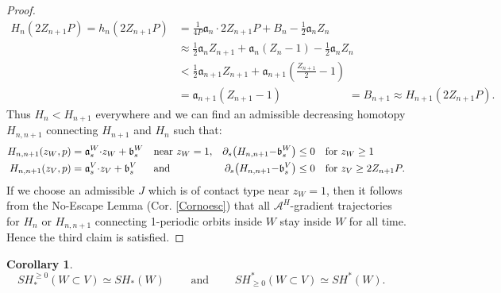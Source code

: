 \documentclass[a4paper,12pt,bibliography=totocnumbered,titlepage=false,abstracton,bookmarksnumbered=true]{scrartcl}
\newtheorem{cor}[defn]{Corollary}
\theoremstyle{definition}
\begin{document}
\begin{proof}
\begin{align*}
 H_n(2Z_{n+1}P)=h_n(2Z_{n+1}P)&=\textstyle\frac{1}{4P}\mathfrak{a}_n{\cdot} 2Z_{n+1}P+B_n-\frac{1}{2}\mathfrak{a}_nZ_n\\
 &\approx \textstyle\frac{1}{2}\mathfrak{a}_nZ_{n+1}+\mathfrak{a}_n(Z_n{-}1)-\frac{1}{2}\mathfrak{a}_nZ_n\\
 &<\textstyle\frac{1}{2}\mathfrak{a}_{n+1}Z_{n+1}+\mathfrak{a}_{n+1}(\frac{Z_{n+1}}{2}-1)\\
 &=\mathfrak{a}_{n+1}(Z_{n+1}{-}1)\qquad\qquad\qquad=B_{n+1}\approx H_{n+1}(2Z_{n+1}P).
\end{align*}
Thus $H_n<H_{n+1}$ everywhere and we can find an admissible decreasing homotopy $H_{n,n+1}$ connecting $H_{n+1}$ and $H_n$ such that:
\begin{align*}
 H_{n,n+1}(z_W,p)&=\mathfrak{a}_s^W{\cdot} z_W + \mathfrak{b}^W_s & &\text{near }z_W=1,& \partial_s \big(H_{n,n+1}{-}\mathfrak{b}^W_s\big)&\leq 0 &&\text{for }z_W\geq 1\\
 H_{n,n+1}(z_V,p)&=\mathfrak{a}_s^V{\cdot} z_V + \mathfrak{b}^V_s & &\text{and}& \partial_s \big(H_{n,n+1}{-}\mathfrak{b}^V_s\big)&\leq 0 &&\text{for $z_V\geq 2Z_{n+1}P$}\mspace{-1mu}.
\end{align*}
If we choose an admissible $J$ which is of contact type near $z_W=1$, then it follows from the No-Escape Lemma (Cor. \ref{Cornoesc}) that all $\mathcal{A}^H$-gradient trajectories for $H_n$ or $H_{n,n+1}$ connecting 1-periodic orbits inside $W$ stay inside $W$ for all time. Hence the third claim is satisfied.
\end{proof}
\begin{cor}\label{transfer} $\quad\displaystyle SH^{\geq 0}_\ast(W{\subset}V)\simeq SH_\ast(W)\qquad\text{ and }\qquad SH^\ast_{\geq0}(W{\subset}V)\simeq SH^\ast(W).$
\end{cor}
\end{document}
